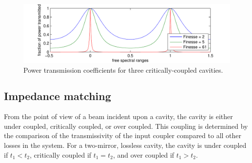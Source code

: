 \begin{figure}
\begin{centering}
\includegraphics{figures/finesses}
\end{centering}
\caption[Cavity buildup versus detuning]{Power transmission coefficients for three critically-coupled cavities.}
\end{figure}

\subsection{Impedance matching}

From the point of view of a beam incident upon a cavity, the cavity is
either under coupled, critically coupled, or over coupled. This
coupling is determined by the comparison of the transmissivity of the
input coupler compared to all other losses in the system. For a
two-mirror, lossless cavity, the cavity is under coupled if $t_1 <
t_2$, critically coupled if $t_1 = t_2$, and over coupled if $t_1 >
t_2$.



